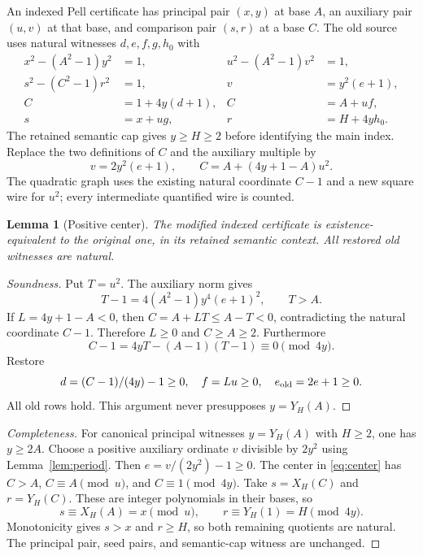 \documentclass[11pt,letterpaper]{article}
\newtheorem{lemma}[theorem]{Lemma}
\theoremstyle{remark}\newtheorem{remark}[theorem]{Remark}
\begin{document}
An indexed Pell certificate has principal pair $(x,y)$ at base $A$, an
auxiliary pair $(u,v)$ at that base, and comparison pair $(s,r)$ at a base
$C$. The old source uses natural witnesses $d,e,f,g,h_0$ with
\begin{align*}
x^2-(A^2-1)y^2&=1,& u^2-(A^2-1)v^2&=1,\\
s^2-(C^2-1)r^2&=1,& v&=y^2(e+1),\\
C&=1+4y(d+1),& C&=A+uf,\\
s&=x+ug,&r&=H+4yh_0.
\end{align*}
The retained semantic cap gives $y\ge H\ge2$ before identifying the main
index. Replace the two definitions of $C$ and the auxiliary multiple by
\begin{equation}\label{eq:center}
\boxed{v=2y^2(e+1),\qquad C=A+(4y+1-A)u^2.}
\end{equation}
The quadratic graph uses the existing natural coordinate $C-1$ and a new
square wire for $u^2$; every intermediate quantified wire is counted.

\begin{lemma}[Positive center]\label{lem:center}
The modified indexed certificate is existence-equivalent to the original
one, in its retained semantic context. All restored old witnesses are natural.
\end{lemma}
\begin{proof}[Soundness]
Put $T=u^2$. The auxiliary norm gives
\[
T-1=4(A^2-1)y^4(e+1)^2,\qquad T>A.
\]
If $L=4y+1-A<0$, then $C=A+LT\le A-T<0$, contradicting the natural
coordinate $C-1$. Therefore $L\ge0$ and $C\ge A\ge2$.
Furthermore
\[
C-1=4yT-(A-1)(T-1)\equiv0\pmod{4y}.
\]
Restore
\[
d=(C-1)/(4y)-1\ge0,\quad f=Lu\ge0,\quad e_{\rm old}=2e+1\ge0.
\]
All old rows hold. This argument never presupposes $y=Y_H(A)$.
\end{proof}
\begin{proof}[Completeness]
For canonical principal witnesses $y=Y_H(A)$ with $H\ge2$, one has
$y\ge2A$. Choose a positive auxiliary ordinate $v$ divisible by $2y^2$
using Lemma~\ref{lem:period}. Then $e=v/(2y^2)-1\ge0$.
The center in \eqref{eq:center} has $C>A$, $C\equiv A\pmod u$,
and $C\equiv1\pmod{4y}$. Take $s=X_H(C)$ and $r=Y_H(C)$.
These are integer polynomials in their bases, so
\[
s\equiv X_H(A)=x\pmod u,\qquad r\equiv Y_H(1)=H\pmod{4y}.
\]
Monotonicity gives $s>x$ and $r\ge H$, so both remaining quotients
are natural. The principal pair, seed pairs, and semantic-cap witness
are unchanged.
\end{proof}
\end{document}

